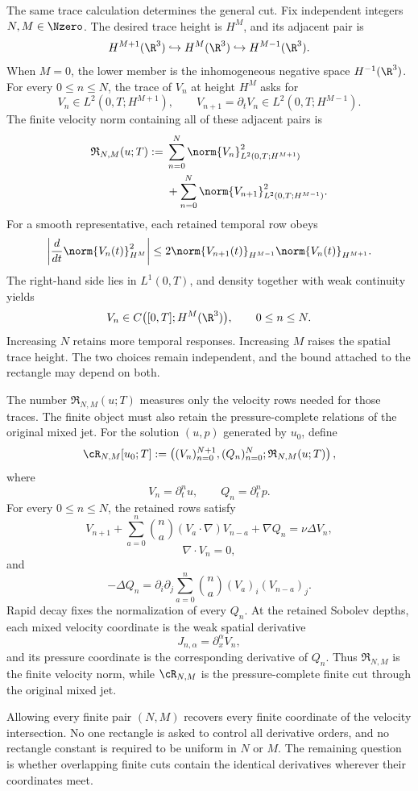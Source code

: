 The same trace calculation determines the general cut.
Fix independent integers \(N,M\in\Nzero\).
The desired trace height is \(H^M\), and its adjacent pair is
\[
  H^{M+1}(\R^3)
  \hookrightarrow
  H^M(\R^3)
  \hookrightarrow
  H^{M-1}(\R^3).
\]
When \(M=0\), the lower member is the inhomogeneous negative space \(H^{-1}(\R^3)\).
For every \(0\le n\le N\), the trace of \(V_n\) at height \(H^M\) asks for
\[
  V_n\in L^2(0,T;H^{M+1}),
  \qquad
  V_{n+1}=\partial_tV_n\in L^2(0,T;H^{M-1}).
\]
The finite velocity norm containing all of these adjacent pairs is
\begin{align*}
  \mathfrak R_{N,M}(u;T)
  :={}&
  \sum_{n=0}^{N}
  \norm{V_n}_{L^2(0,T;H^{M+1})}^{2}
  \\
  &+
  \sum_{n=0}^{N}
  \norm{V_{n+1}}_{L^2(0,T;H^{M-1})}^{2}.
\end{align*}
For a smooth representative, each retained temporal row obeys
\[
  \left|
    \frac{d}{dt}\norm{V_n(t)}_{H^M}^{2}
  \right|
  \le
  2
  \norm{V_{n+1}(t)}_{H^{M-1}}
  \norm{V_n(t)}_{H^{M+1}}.
\]
The right-hand side lies in \(L^1(0,T)\), and density together with weak continuity yields
\[
  V_n
  \in
  C\bigl([0,T];H^M(\R^3)\bigr),
  \qquad
  0\le n\le N.
\]
Increasing \(N\) retains more temporal responses.
Increasing \(M\) raises the spatial trace height.
The two choices remain independent, and the bound attached to the rectangle may depend on both.

The number \(\mathfrak R_{N,M}(u;T)\) measures only the velocity rows needed for those traces.
The finite object must also retain the pressure-complete relations of the original mixed jet.
For the solution \((u,p)\) generated by \(u_0\), define
\[
  \cR_{N,M}[u_0;T]
  :=
  \left(
    (V_n)_{n=0}^{N+1},
    (Q_n)_{n=0}^{N};
    \mathfrak R_{N,M}(u;T)
  \right),
\]
where
\[
  V_n=\partial_t^nu,
  \qquad
  Q_n=\partial_t^np.
\]
For every \(0\le n\le N\), the retained rows satisfy
\[
  V_{n+1}
  +
  \sum_{a=0}^{n}
  \binom{n}{a}
  (V_a\cdot\nabla)V_{n-a}
  +\nabla Q_n
  =
  \nu\Delta V_n,
\]
\[
  \nabla\cdot V_n=0,
\]
and
\[
  -\Delta Q_n
  =
  \partial_i\partial_j
  \sum_{a=0}^{n}
  \binom{n}{a}
  (V_a)_i(V_{n-a})_j.
\]
Rapid decay fixes the normalization of every \(Q_n\).
At the retained Sobolev depths, each mixed velocity coordinate is the weak spatial derivative
\[
  J_{n,\alpha}=\partial_x^\alpha V_n,
\]
and its pressure coordinate is the corresponding derivative of \(Q_n\).
Thus \(\mathfrak R_{N,M}\) is the finite velocity norm, while \(\cR_{N,M}\) is the pressure-complete finite cut through the original mixed jet.

Allowing every finite pair \((N,M)\) recovers every finite coordinate of the velocity intersection.
No one rectangle is asked to control all derivative orders, and no rectangle constant is required to be uniform in \(N\) or \(M\).
The remaining question is whether overlapping finite cuts contain the identical derivatives wherever their coordinates meet.
